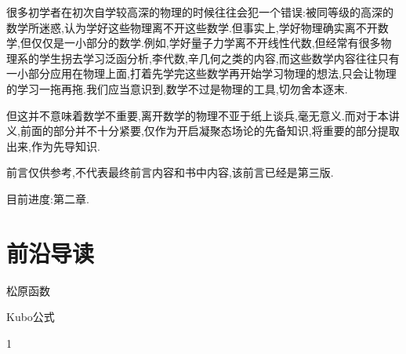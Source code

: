 \documentclass[lang=cn,newtx,10pt,scheme=chinese,thmcnt=section]{elegantbook}
\begin{document}
很多初学者在初次自学较高深的物理的时候往往会犯一个错误:被同等级的高深的数学所迷惑,认为学好这些物理离不开这些数学.但事实上,学好物理确实离不开数学,但仅仅是一小部分的数学.例如,学好量子力学离不开线性代数,但经常有很多物理系的学生拐去学习泛函分析,李代数,辛几何之类的内容,而这些数学内容往往只有一小部分应用在物理上面,打着先学完这些数学再开始学习物理的想法,只会让物理的学习一拖再拖.我们应当意识到,数学不过是物理的工具,切勿舍本逐末.

但这并不意味着数学不重要,离开数学的物理不亚于纸上谈兵,毫无意义.而对于本讲义,前面的部分并不十分紧要,仅作为开启凝聚态场论的先备知识,将重要的部分提取出来,作为先导知识.%

前言仅供参考,不代表最终前言内容和书中内容,该前言已经是第三版.



目前进度:第二章.

%
%












\chapter{前沿导读}
\begin{introduction}
	\item 松原函数
	\item Kubo公式
\end{introduction}
1
























\nocite{*}

\printbibliography[heading=bibintoc, title=\ebibname]
\appendix

\end{document}
